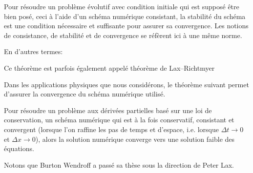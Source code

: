 \begin{theoreme}
Pour résoudre un problème évolutif avec condition initiale qui est supposé être bien posé, ceci à l'aide d'un schéma numérique consistant, la stabilité du schéma est une condition nécessaire et suffisante pour assurer sa convergence. Les notions de consistance, de stabilité et de convergence se réfèrent ici à une même norme.

En d'autres termes: 
\end{theoreme}
Ce théorème est parfois également appelé théorème de Lax–Richtmyer

\medskip
Dans les applications physiques que nous considérons, le théorème suivant permet d'assurer la convergence du schéma numérique utilisé.
\begin{theoreme}
Pour résoudre un problème aux dérivées partielles basé sur une loi de conservation, un schéma numérique qui est à la fois conservatif, consistant et convergent (lorsque l'on raffine les pas de temps et d'espace, i.e. lorsque $\Delta t \rightarrow 0$ et $\Delta x \rightarrow 0$), alors la solution numérique converge vers une solution faible des équations.
\end{theoreme}

Notons que Burton Wendroff a passé sa thèse sous la direction de Peter Lax.

